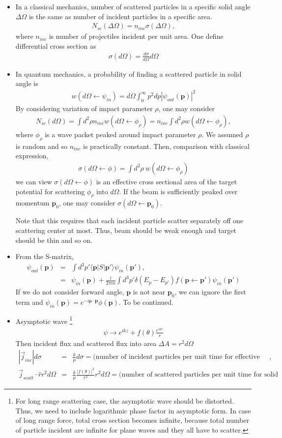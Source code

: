 \documentclass[10pt]{book}
\def\bm{\boldsymbol}
\newcommand{\bea}{\begin{eqnarray}}
\newcommand{\eea}{\end{eqnarray}}
\newcommand{\no}{\nonumber \\}
\def\vp{{\bm p}}
\def\la{\langle}
\def\ra{\rangle}
\begin{document}
\begin{itemize}
\item In a classical mechanics, number of scattered particles in a specific solid angle $\Delta\Omega$
      is the same as number of incident particles in a specific area. 
      \bea 
      N_{sc}(\Delta\Omega) = n_{inc} \sigma(\Delta\Omega),
      \eea 
      where $n_{inc}$ is number of projectiles incident per unit area. 
      One define differential cross section as
      \bea 
      \sigma(d\Omega) = \frac{d\sigma}{d\Omega} d\Omega 
      \eea 

\item In quantum mechanics, a probability of finding a scattered particle in solid angle is
     \bea 
     w(d\Omega\leftarrow \psi_{in})=d\Omega \int_0^\infty p^2 dp |\psi_{out}(\vp)|^2
     \eea 
     By considering variation of impact parameter $\rho$, one may consider
     \bea 
     N_{sc}(d\Omega)= \int d^2 \rho n_{inc}  w(d\Omega\leftarrow \phi_\rho)
     = n_{inc} \int d^2 \rho   w(d\Omega\leftarrow \phi_\rho),
     \eea 
     where $\phi_\rho$ is a wave packet peaked around impact parameter $\rho$. We assumed $\rho$
      is random and so $n_{inc}$ is practically constant. 
     Then, comparison with classical expression,
     \bea 
     \sigma(d\Omega\leftarrow \phi)=\int d^2\rho\ w(d\Omega\leftarrow \phi_\rho)
     \eea 
     we can view $\sigma(d\Omega\leftarrow \phi)$ is an effective cross sectional area of the target 
     potential for scattering $\phi_\rho$ into $d\Omega$. If the beam is sufficiently peaked over momentum $\vp_0$,
     one may consider  $\sigma(d\Omega\leftarrow \vp_0)$.
     
     Note that this requires that each incident particle scatter separately off one scattering center at most.
     Thus, beam should be weak enough and target should be thin and so on.   
     
\item From the S-matrix,
  \bea 
  \psi_{out}(\vp)&=&\int d^3 p' \la \vp|S|\vp'\ra \psi_{in}(\vp'),\no 
                 &=&\psi_{in}(\vp)+\frac{i}{2\pi m}\int d^3p' \delta(E_{p}-E_{p'})f(\vp\leftarrow \vp')\psi_{in}(\vp')
  \eea 
  If we do not consider forward angle, $\vp$ is not near $\vp_0$, we can ignore the first term
  and $\psi_{in}(\vp)=e^{-i{\bm \rho}\cdot\vp}\phi(\vp)$.
   {\color{red} To be continued.}
   
\item Asymptotic wave \footnote{
For long range scattering case, the asymptotic wave should be
distorted. Thus, we need to include logarithmic phase factor
in asymptotic form. In case of long range force,
total cross section becomes infinite, because
total number of particle incident are infinite for
plane waves and they all have to scatter.
}
\bea
\psi\to e^{ikz}+f(\theta)\frac{e^{ikr}}{r}
\eea
Then incident flux and scattered flux into area $\Delta A=r^2 d\Omega$
\bea 
|{\vec j}_{inc}|d\sigma &=&\frac{k}{\mu}d\sigma=\mbox{(number of incident particles per unit time for effective area per one target)},\no 
{\vec j}_{scatt}\cdot \hat{r} r^2 d\Omega&=&\frac{k}{\mu}\frac{|f(\theta)|^2}{r^2} r^2 d\Omega
=\mbox{(number of scattered particles per unit time for solid area)}
\eea 


\end{itemize}
\end{document}
